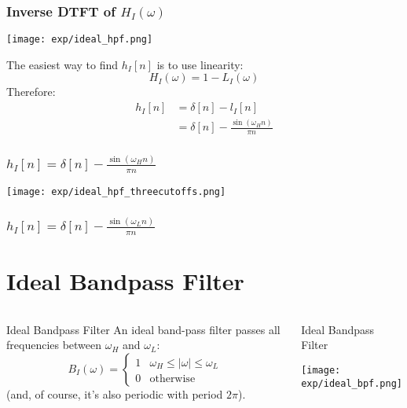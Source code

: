 \documentclass{beamer}
\begin{document}
\begin{frame}
  \frametitle{Inverse DTFT of $H_I(\omega)$}

  \centerline{\texttt{[image: exp/ideal\_hpf.png]}}
  
  The easiest way to find $h_I[n]$ is to use linearity:
  \[
  H_I(\omega) = 1 - L_I(\omega)
  \]
  Therefore:
  \begin{align*}
    h_I[n] &= \delta[n] - l_I[n]\\
    &= \delta[n] - \frac{\sin(\omega_H n)}{\pi n}
  \end{align*}
\end{frame}

\begin{frame}
  \frametitle{$h_I[n]=\delta[n]-\frac{\sin(\omega_H n)}{\pi n}$}

  \centerline{\texttt{[image: exp/ideal\_hpf\_threecutoffs.png]}}

\end{frame}


\begin{frame}
  \frametitle{$h_I[n]=\delta[n]-\frac{\sin(\omega_L n)}{\pi n}$}

  \centerline{}  
\end{frame}


\section[Ideal BPF]{Ideal Bandpass Filter}
\setcounter{subsection}{1}

\begin{frame}
  \begin{columns}
    \column{2.25in}
    \begin{block}{Ideal Bandpass Filter}
      An ideal band-pass filter passes all frequencies between $\omega_H$ and $\omega_L$:
      \[
      B_I(\omega)
      = \begin{cases} 1& \omega_H\le |\omega|\le \omega_L\\
        0 & \mbox{otherwise}
      \end{cases}
      \]
      (and, of course, it's also periodic with period $2\pi$).
    \end{block}
    \column{2.25in}
    \begin{block}{Ideal Bandpass Filter}
      \centerline{\texttt{[image: exp/ideal\_bpf.png]}}
    \end{block}
  \end{columns}
\end{frame}
\end{document}

